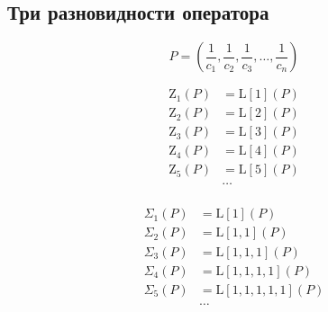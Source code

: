 
\subsection{Три разновидности оператора}

\begin{equation*}
P =
\left( 
\frac{1}{c_1},
\frac{1}{c_2}, 
\frac{1}{c_3}, 
{} \ldots, 
\frac{1}{c_n}
\right) 
\end{equation*}

\begin{equation*} \begin{aligned}
\mathrm{Z}_1(P) &= \mathrm{L}[1](P) \\
\mathrm{Z}_2(P) &= \mathrm{L}[2](P) \\
\mathrm{Z}_3(P) &= \mathrm{L}[3](P) \\
\mathrm{Z}_4(P) &= \mathrm{L}[4](P) \\
\mathrm{Z}_5(P) &= \mathrm{L}[5](P) \\
&\ldots \\
\end{aligned} \end{equation*}

\begin{equation*} \begin{aligned}
\Sigma_1(P) &= \mathrm{L}[1](P) \\
\Sigma_2(P) &= \mathrm{L}[1,1](P) \\
\Sigma_3(P) &= \mathrm{L}[1,1,1](P) \\
\Sigma_4(P) &= \mathrm{L}[1,1,1,1](P) \\
\Sigma_5(P) &= \mathrm{L}[1,1,1,1,1](P) \\
&\ldots \\
\end{aligned} \end{equation*}

